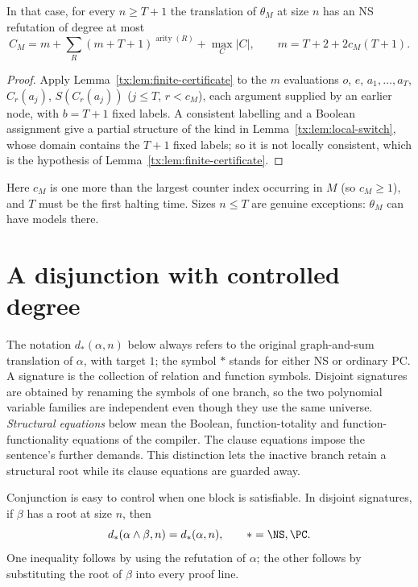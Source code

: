 \begin{corollary}\label{tx:cor:switch-degree}
In that case, for every $n\ge T+1$ the translation of $\theta_M$ at size $n$ has an NS refutation
of degree at most
\[
 C_M=m+\sum_R(m+T+1)^{\operatorname{arity}(R)}+\max_{C}|C|,\qquad m=T+2+2c_M(T+1).
\]
\end{corollary}
\begin{proof}
Apply Lemma~\ref{tx:lem:finite-certificate} to the $m$ evaluations $o$, $e$, $a_1,\ldots,a_T$,
$C_r(a_j)$, $S(C_r(a_j))$ ($j\le T$, $r<c_M$), each argument supplied by an earlier node, with
$b=T+1$ fixed labels. A consistent labelling and a Boolean assignment give a partial structure of
the kind in Lemma~\ref{tx:lem:local-switch}, whose domain contains the $T+1$ fixed labels; so it is not
locally consistent, which is the hypothesis of Lemma~\ref{tx:lem:finite-certificate}.
\end{proof}

Here $c_M$ is one more than the largest counter index occurring in $M$ (so $c_M\ge1$), and $T$ must be
the first halting time. Sizes $n\le T$ are genuine exceptions: $\theta_M$ can have models there.

\section{A disjunction with controlled degree}
The notation $d_*(\alpha,n)$ below always refers to the original
graph-and-sum translation of $\alpha$, with target $1$; the symbol $*$
stands for either NS or ordinary PC.
A signature is the collection of relation and function symbols.
Disjoint signatures are obtained by renaming the symbols of one branch,
so the two polynomial variable families are independent even though
they use the same universe. \emph{Structural equations} below mean the
Boolean, function-totality and function-functionality equations of the
compiler. The clause equations impose the sentence's further demands.
This distinction lets the inactive branch retain a structural root
while its clause equations are guarded away.

Conjunction is easy to control when one block is satisfiable. In disjoint
signatures, if $\beta$ has a root at size $n$, then
\begin{equation}\label{tx:eq:satisfiable-block}
 d_*(\alpha\wedge\beta,n)=d_*(\alpha,n),
 \qquad *=\NS,\PC.
\end{equation}
One inequality follows by using the refutation of $\alpha$; the other
follows by substituting the root of $\beta$ into every proof line.

